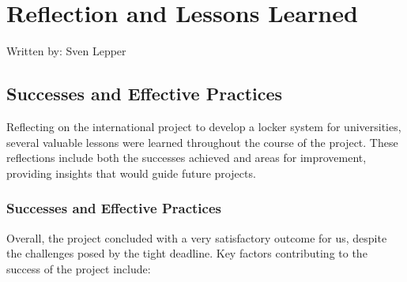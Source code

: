 \section{Reflection and Lessons Learned}
{\tiny Written by: Sven Lepper}\\

\subsection{Successes and Effective Practices}

Reflecting on the international project to develop a locker system for universities, several valuable lessons were learned throughout the course of the project. These reflections include both the successes achieved and areas for improvement, providing insights that would guide future projects.

\subsubsection{Successes and Effective Practices}

Overall, the project concluded with a very satisfactory outcome for us, despite the challenges posed by the tight deadline. Key factors contributing to the success of the project include:

